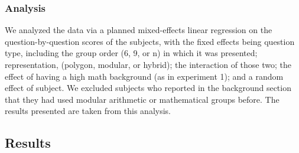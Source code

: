 \documentclass[11pt]{article}
\begin{document}
\subsubsection{Analysis}
We analyzed the data via a planned mixed-effects linear regression on the question-by-question scores of the subjects, with the fixed effects being question type, including the group order (6, 9, or n) in which it was presented; representation, (polygon, modular, or hybrid); the interaction of those two; the effect of having a high math background (as in experiment 1); and a random effect of subject. We excluded subjects who reported in the background section that they had used modular arithmetic or mathematical groups before. The results presented are taken from this analysis.
\subsection{Results}
\end{document}
